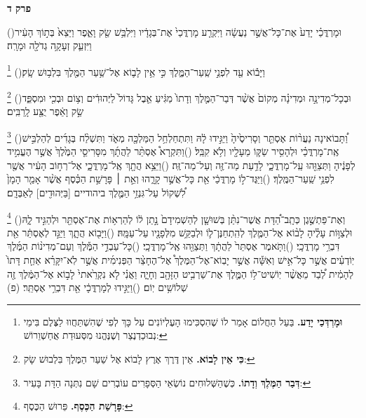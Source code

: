 \documentclass[12pt, openany]{book}
\newcommand{\chapname}{}
\newcommand{\newchap}[1]{
	\addcontentsline{toc}{chapter}{#1}
	\renewcommand{\chapname}{#1}
		\begin{center}
			\textbf{%
\fontsize{16pt}{16pt}\selectfont
				#1}
		\end{center}
}
\newcommand{\footnotecomment}[1]{
	\renewcommand\thefootnote{}
	\footnote{\textsf{#1}}}
\newcommand{\commenta}[1]{\footnotecomment{#1}\hspace{0em}}
\newcommand{\vsnum}[1]{(\hebrewnumeral{#1})\space}
\begin{document}
\newchap{פרק ד}
\begin{multicols}{2}
\vsnum{1}וּמָרְדֳּכַ֗י יָדַע֙ אֶת־כָּל־אֲשֶׁ֣ר נַעֲשָׂ֔ה וַיִּקְרַ֤ע מָרְדֳּכַי֙ אֶת־בְּגָדָ֔יו וַיִּלְבַּ֥שׁ שַׂ֖ק וָאֵ֑פֶר וַיֵּצֵא֙ בְּת֣וֹךְ הָעִ֔יר וַיִּזְעַ֛ק זְעָקָ֥ה גְדֹלָ֖ה וּמָרָֽה׃%
\commenta{\textrm{\textbf{וּמָרְדְּכַי יָדַע.}} בַּעַל הַחֲלוֹם אָמַר לוֹ שֶׁהִסְכִּימוּ הָעֶלְיוֹנִים עַל כָּךְ לְפִי שֶׁהִשְׁתַּחֲווּ לַצֶּלֶם בִּימֵי נְבוּכַדְנֶצַר וְשֶׁנֶּהֱנוּ מִסְּעוּדַת אֲחַשְׁוֵרוֹשׁ:}%
\vsnum{2}וַיָּב֕וֹא עַ֖ד לִפְנֵ֣י שַֽׁעַר־הַמֶּ֑לֶךְ כִּ֣י אֵ֥ין לָב֛וֹא אֶל־שַׁ֥עַר הַמֶּ֖לֶךְ בִּלְב֥וּשׁ שָֽׂק׃%
\commenta{\textrm{\textbf{כִּי אֵין לָבוֹא.}} אֵין דֶּרֶךְ אֶרֶץ לָבוֹא אֶל שַׁעַר הַמֶּלֶךְ בִּלְבוּשׁ שָׂק:}%
\vsnum{3}וּבְכָל־מְדִינָ֣ה וּמְדִינָ֗ה מְקוֹם֙ אֲשֶׁ֨ר דְּבַר־הַמֶּ֤לֶךְ וְדָתוֹ֙ מַגִּ֔יעַ אֵ֤בֶל גָּדוֹל֙ לַיְּהוּדִ֔ים וְצ֥וֹם וּבְכִ֖י וּמִסְפֵּ֑ד שַׂ֣ק וָאֵ֔פֶר יֻצַּ֖ע לָֽרַבִּֽים׃%
\commenta{\textrm{\textbf{דְּבַר הַמֶּלֶךְ וְדָתוֹ.}} כְּשֶׁהַשְּׁלוּחִים נוֹשְׂאֵי הַסְּפָרִים עוֹבְרִים שָׁם נִתְּנָה הַדָּת בָּעִיר:}%
\vsnum{4}וַ֠תָּבוֹאינָה נַעֲר֨וֹת אֶסְתֵּ֤ר וְסָרִיסֶ֙יהָ֙ וַיַּגִּ֣ידוּ לָ֔הּ וַתִּתְחַלְחַ֥ל הַמַּלְכָּ֖ה מְאֹ֑ד וַתִּשְׁלַ֨ח בְּגָדִ֜ים לְהַלְבִּ֣ישׁ אֶֽת־מָרְדֳּכַ֗י וּלְהָסִ֥יר שַׂקּ֛וֹ מֵעָלָ֖יו וְלֹ֥א קִבֵּֽל׃
\vsnum{5}וַתִּקְרָא֩ אֶסְתֵּ֨ר לַהֲתָ֜ךְ מִסָּרִיסֵ֤י הַמֶּ֙לֶךְ֙ אֲשֶׁ֣ר הֶעֱמִ֣יד לְפָנֶ֔יהָ וַתְּצַוֵּ֖הוּ עַֽל־מָרְדֳּכָ֑י לָדַ֥עַת מַה־זֶּ֖ה וְעַל־מַה־זֶּֽה׃
\vsnum{6}וַיֵּצֵ֥א הֲתָ֖ךְ אֶֽל־מָרְדֳּכָ֑י אֶל־רְח֣וֹב הָעִ֔יר אֲשֶׁ֖ר לִפְנֵ֥י שַֽׁעַר־הַמֶּֽלֶךְ׃
\vsnum{7}וַיַּגֶּד־ל֣וֹ מָרְדֳּכַ֔י אֵ֖ת כָּל־אֲשֶׁ֣ר קָרָ֑הוּ וְאֵ֣ת ׀ פָּרָשַׁ֣ת הַכֶּ֗סֶף אֲשֶׁ֨ר אָמַ֤ר הָמָן֙ לִ֠שְׁקוֹל עַל־גִּנְזֵ֥י הַמֶּ֛לֶךְ ביהודיים [בַּיְּהוּדִ֖ים] לְאַבְּדָֽם׃%
\commenta{\textrm{\textbf{פָּרָשַׁת הַכֶּסֶף.}} פֵּרוּשׁ הַכֶּסֶף:}%
\vsnum{8}וְאֶת־פַּתְשֶׁ֣גֶן כְּתָֽב־הַ֠דָּת אֲשֶׁר־נִתַּ֨ן בְּשׁוּשָׁ֤ן לְהַשְׁמִידָם֙ נָ֣תַן ל֔וֹ לְהַרְא֥וֹת אֶת־אֶסְתֵּ֖ר וּלְהַגִּ֣יד לָ֑הּ וּלְצַוּ֣וֹת עָלֶ֗יהָ לָב֨וֹא אֶל־הַמֶּ֧לֶךְ לְהִֽתְחַנֶּן־ל֛וֹ וּלְבַקֵּ֥שׁ מִלְּפָנָ֖יו עַל־עַמָּֽהּ׃
\vsnum{9}וַיָּב֖וֹא הֲתָ֑ךְ וַיַּגֵּ֣ד לְאֶסְתֵּ֔ר אֵ֖ת דִּבְרֵ֥י מָרְדֳּכָֽי׃
\vsnum{10}וַתֹּ֤אמֶר אֶסְתֵּר֙ לַהֲתָ֔ךְ וַתְּצַוֵּ֖הוּ אֶֽל־מָרְדֳּכָֽי׃
\vsnum{11}כָּל־עַבְדֵ֣י הַמֶּ֡לֶךְ וְעַם־מְדִינ֨וֹת הַמֶּ֜לֶךְ יֽוֹדְעִ֗ים אֲשֶׁ֣ר כָּל־אִ֣ישׁ וְאִשָּׁ֡ה אֲשֶׁ֣ר יָבֽוֹא־אֶל־הַמֶּלֶךְ֩ אֶל־הֶחָצֵ֨ר הַפְּנִימִ֜ית אֲשֶׁ֣ר לֹֽא־יִקָּרֵ֗א אַחַ֤ת דָּתוֹ֙ לְהָמִ֔ית לְ֠בַד מֵאֲשֶׁ֨ר יֽוֹשִׁיט־ל֥וֹ הַמֶּ֛לֶךְ אֶת־שַׁרְבִ֥יט הַזָּהָ֖ב וְחָיָ֑ה וַאֲנִ֗י לֹ֤א נִקְרֵ֙אתי֙ לָב֣וֹא אֶל־הַמֶּ֔לֶךְ זֶ֖ה שְׁלוֹשִׁ֥ים יֽוֹם׃
\vsnum{12}וַיַּגִּ֣ידוּ לְמָרְדֳּכָ֔י אֵ֖ת דִּבְרֵ֥י אֶסְתֵּֽר׃ (פ)

\end{multicols}
\end{document}
